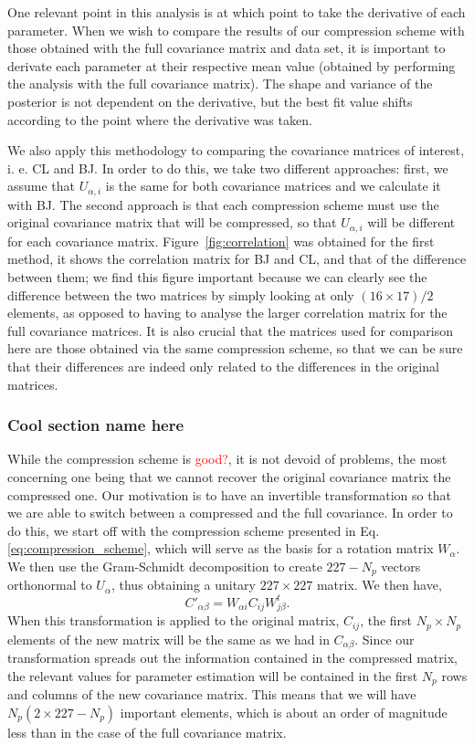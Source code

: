 \documentclass[twocolumn]{\docclass}
\newcommand{\rf}[1]{\ref{fig:#1}}
\newcommand\be{\begin{equation}}
\newcommand\ee{\end{equation}}
\begin{document}
One relevant point in this analysis is at which point to take the derivative of each parameter. When we wish to compare the results of our compression scheme with those obtained with the full covariance matrix and data set, it is important to derivate each parameter at their respective mean value (obtained by performing the analysis with the full covariance matrix). The shape and variance of the posterior is not dependent on the derivative, but the best fit value shifts according to the point where the derivative was taken.

We also apply this methodology to comparing the covariance matrices of interest, i. e. CL and BJ. In order to do this, we take two different approaches: first, we assume that $U_{\alpha, i}$ is the same for both covariance matrices and we calculate it with BJ. The second approach is that each compression scheme must use the original covariance matrix that will be compressed, so that $U_{\alpha, i}$ will be different for each covariance matrix. Figure~\rf{correlation} was obtained for the first method, it shows the correlation matrix for BJ and CL, and that of the difference between them; we find this figure important because we can clearly see the difference between the two matrices by simply looking at only $(16 \times 17)/2$ elements, as opposed to having to analyse the larger correlation matrix for the full covariance matrices. It is also crucial that the matrices used for comparison here are those obtained via the same compression scheme, so that we can be sure that their differences are indeed only related to the differences in the original matrices.

\subsubsection{Cool section name here}

While the compression scheme is \textcolor{red}{good?}, it is not devoid of problems, the most concerning one being that we cannot recover the original covariance matrix the compressed one. Our motivation is to have an invertible transformation so that we are able to switch between a compressed and the full covariance. In order to do this, we start off with the compression scheme presented in Eq. \ref{eq:compression_scheme}, which will serve as the basis for a rotation matrix $W_\alpha$. We then use the Gram-Schmidt decomposition to create $227 - N_p$ vectors orthonormal to $U_{\alpha}$, thus obtaining a unitary $227 \times 227$ matrix. We then have,
\be
C'_{\alpha\beta} = W_{\alpha i} C_{ij} W^t_{j\beta}.
\ee
 When this transformation is applied to the original matrix, $C_{ij}$, the first $N_p \times N_p$ elements of the new matrix will be the same as we had in $C_{\alpha\beta}$. Since our transformation spreads out the information contained in the compressed matrix, the relevant values for parameter estimation will be contained in the first $N_p$ rows and columns of the new covariance matrix. This means that we will have $N_p \left( 2 \times 227 - N_p \right)$ important elements, which is about an order of magnitude less than in the case of the full covariance matrix.
 
\end{document}
